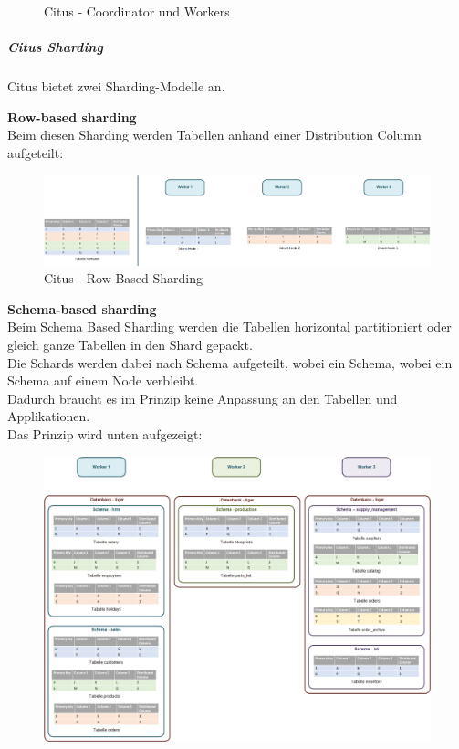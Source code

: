 \begin{flushleft}
\begin{flushleft}
\begin{figure}[H]
            \caption{Citus - Coordinator und Workers}
            \label{fig:citus_coordinator_worker}
        \end{figure}
    \end{flushleft}
    \begin{flushleft}
        \subparagraph{Citus Sharding}
        \label{subpar:citus_sharding}
        Citus bietet zwei Sharding-Modelle an.
        \begin{flushleft}
            \textbf{Row-based sharding}\\
            Beim diesen Sharding werden Tabellen anhand einer Distribution Column aufgeteilt\cite{2Y5FA36C, FDUUL9IM}:
            \begin{figure}[H]
                \centering
                \includegraphics[width=0.8\linewidth]{source/implementation/evaluation/postgresql_ha_solutions/stackgres/citus_row-based-sharding}
                \caption{Citus - Row-Based-Sharding}
                \label{fig:citus_row-based-sharding}
            \end{figure}
        \end{flushleft}
        \begin{flushleft}
            \textbf{Schema-based sharding}\\
            Beim Schema Based Sharding werden die Tabellen horizontal partitioniert oder gleich ganze Tabellen in den Shard gepackt.\\
            Die Schards werden dabei nach Schema aufgeteilt, wobei ein Schema, wobei ein Schema auf einem Node verbleibt.\\
            Dadurch braucht es im Prinzip keine Anpassung an den Tabellen und Applikationen.\\
            Das Prinzip wird unten aufgezeigt:
            \begin{figure}[H]
                \centering
                \includegraphics[width=0.8\linewidth]{source/implementation/evaluation/postgresql_ha_solutions/stackgres/citus_schema-based-sharding}

\end{figure}
\end{flushleft}
\end{flushleft}
\end{flushleft}
